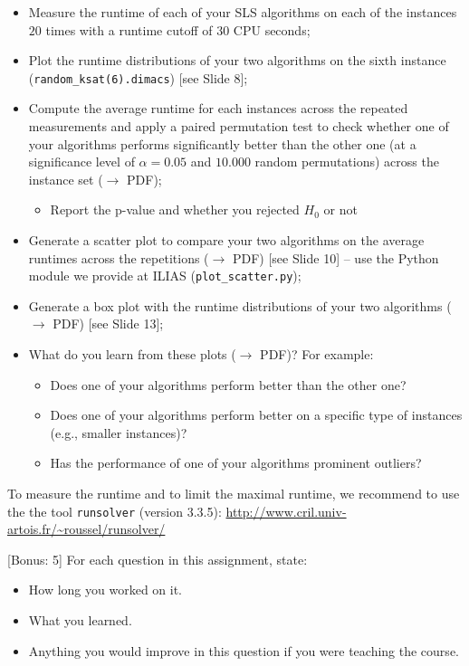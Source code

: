 \documentclass{exam}
\begin{document}
\begin{questions}
\begin{itemize}
  \item Measure the runtime of each of your SLS algorithms on each of the instances $20$ times with a runtime cutoff of $30$ CPU seconds;
  \item Plot the runtime distributions of your two algorithms on the sixth instance (\texttt{random\_ksat(6).dimacs}) [see Slide 8];
  \item Compute the average runtime for each instances across the repeated measurements and apply a paired permutation test to check whether one of your algorithms performs significantly better than the other one (at a significance level of $\alpha = 0.05$ and $10.000$ random permutations) across the instance set ($\to$ PDF);
  \begin{itemize}
    \item Report the p-value and whether you rejected $H_0$ or not 
  \end{itemize}
  \item Generate a scatter plot to compare your two algorithms on the average runtimes across the repetitions ($\to$ PDF) [see Slide 10] -- use the Python module we provide at ILIAS (\texttt{plot\_scatter.py});
  \item Generate a box plot with the runtime distributions of your two algorithms ($\to$ PDF) [see Slide 13];
  \item What do you learn from these plots ($\to$ PDF)? For example: 
  \begin{itemize}
    \item Does one of your algorithms perform better than the other one?
    \item Does one of your algorithms perform better on a specific type of instances (e.g., smaller instances)?
    \item Has the performance of one of your algorithms prominent outliers?
  \end{itemize}
\end{itemize}

To measure the runtime and to limit the maximal runtime, we recommend to use the the tool \texttt{runsolver} (version 3.3.5):
\url{http://www.cril.univ-artois.fr/~roussel/runsolver/}

[Bonus: 5]
For each question in this assignment, state:
\begin{itemize}
	\item How long you worked on it.
	\item What you learned.
	\item Anything you would improve in this question if you were teaching the course.
\end{itemize}

\end{questions}
\end{document}

